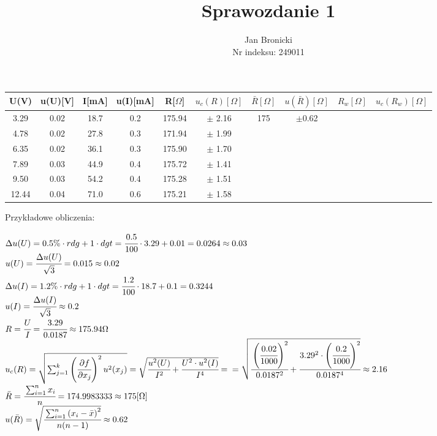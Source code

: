 \documentclass{article}
\title{Sprawozdanie 1}
\author{Jan Bronicki \\
Nr indeksu: 249011}
\date{}
\begin{document}
\maketitle



\begin{center}
    \renewcommand{\arraystretch}{1.3}
\begin{tabular}{ |c|c|c|c|c|c|c|c|c|c| }
    \hline
    U(V)&u(U)[V]&I[mA]&u(I)[mA]&R[$\Omega$]&$u_c(R)[\Omega]$&$\bar{R}[\Omega]$&$u(\bar{R})[\Omega]$&$R_w[\Omega]$&$u_c(R_w)[\Omega]$ \\
    \hline \hline
    3.29&0.02&18.7&0.2&175.94&$\pm$ 2.16& \multirow{6}{*}{175}&\multirow{6}{*}{$\pm$0.62}&&\\ 
    \cline{1-6}
    \cline{9-10}
    4.78&0.02&27.8&0.3&171.94&$\pm$ 1.99&&&&\\ 
    \cline{1-6}
    \cline{9-10}
    6.35&0.02&36.1&0.3&175.90&$\pm$ 1.70&&&&\\ 
    \cline{1-6}
    \cline{9-10}
    7.89&0.03&44.9&0.4&175.72&$\pm$ 1.41&&&&\\ 
    \cline{1-6}
    \cline{9-10}
    9.50&0.03&54.2&0.4&175.28&$\pm$ 1.51&&&&\\ 
    \cline{1-6}
    \cline{9-10}
    12.44&0.04&71.0&0.6&175.21&$\pm$ 1.58&&&&\\ 
    \hline
\end{tabular}
\end{center}
Przykładowe obliczenia:
\begin{center}
    $\Delta u(U)  = 0.5\% \cdot rdg+1 \cdot dgt=\cfrac{0.5}{100} \cdot 3.29 + 0.01=0.0264\approx0.03$\\
    $u(U)=\cfrac{\Delta u(U)}{\sqrt{3}}=0.015\approx0.02$\\
    $\Delta u(I) = 1.2\% \cdot rdg+1 \cdot dgt = \cfrac{1.2}{100} \cdot 18.7 +0.1 =0.3244$\\
    $u(I)= \cfrac{\Delta u(I)}{\sqrt{3}} \approx 0.2$\\
    $R=\cfrac{U}{I} = \cfrac{3.29}{0.0187} \approx 175.94 \Omega$\\
    $u_c (R)=\sqrt{\sum_{j=1}^{k}\left( \cfrac{\partial f}{\partial x_j}\right)^2 u^2 (x_j)}
    =\sqrt{\cfrac{u^2 (U)}{I^2} + \cfrac{U^2 \cdot u^2 (I)}{I^4}}=$
    $= \sqrt{\cfrac{\left(\cfrac{0.02}{1000}\right)^2}{0.0187^2} + \cfrac{3.29^2 \cdot \left(\cfrac{0.2}{1000}\right)^2}{0.0187^4}}\approx 2.16$\\
    $\bar{R} = \cfrac{\sum_{i=1}^{n}x_i}{n}=174.9983333 \approx 175[\Omega]$\\
    $u(\bar{R}) = \sqrt{\cfrac{\sum_{i=1}^{n} \left(x_i - \bar{x} \right)^2}{n(n-1)}}\approx 0.62$\\

\end{center}
\end{document}
